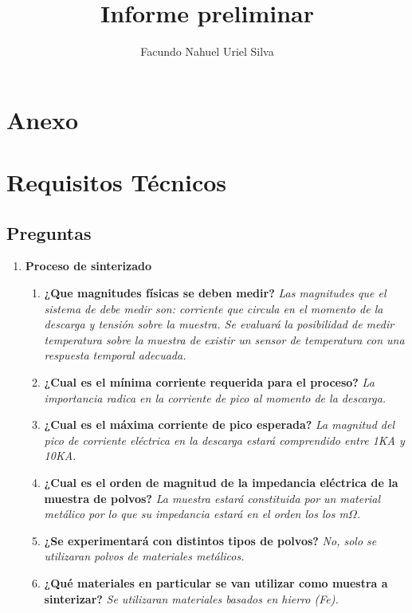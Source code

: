 \documentclass[12pt]{article}
\title{Informe preliminar}
\author{Facundo Nahuel Uriel Silva}
\begin{document}
\section{Anexo}

\section{Requisitos Técnicos}

\subsection{Preguntas}
  
 \begin{enumerate} 
      \item \textbf{ Proceso de sinterizado }
	\begin{enumerate}
	  \item \textbf{ ¿Que magnitudes físicas se deben medir? }
		\subitem	\textit{ Las magnitudes que el sistema de debe medir son: corriente que circula en el momento de la descarga y 
					tensión sobre la muestra. Se evaluará la posibilidad de medir temperatura sobre la muestra de existir un
					sensor de temperatura con una respuesta temporal adecuada.
			}

	  \item \textbf{ ¿Cual es el mínima corriente requerida para el proceso? }
		\subitem	\textit{ La importancia radica en la corriente de pico al momento de la descarga.
				}

	  \item \textbf{ ¿Cual es el máxima corriente de pico esperada? }
		\subitem	\textit{ La magnitud del pico de corriente eléctrica en la descarga estará comprendido entre 1KA y 10KA.
				}

	  \item \textbf{ ¿Cual es el orden de magnitud de la impedancia eléctrica de la muestra de polvos? }
		\subitem	\textit{ La muestra estará constituida por un material metálico por lo que su impedancia estará en el orden los los m$\Omega$.
				}

	  \item \textbf{ ¿Se experimentará con distintos tipos de polvos? }
		\subitem	\textit{ No, solo se utilizaran polvos de materiales metálicos.
				}

          \item \textbf{ ¿Qué materiales en particular se van utilizar como muestra a sinterizar? }
		\subitem	\textit{ Se utilizaran materiales basados en hierro (Fe).
				}


\end{enumerate}
\end{enumerate}
\end{document}
